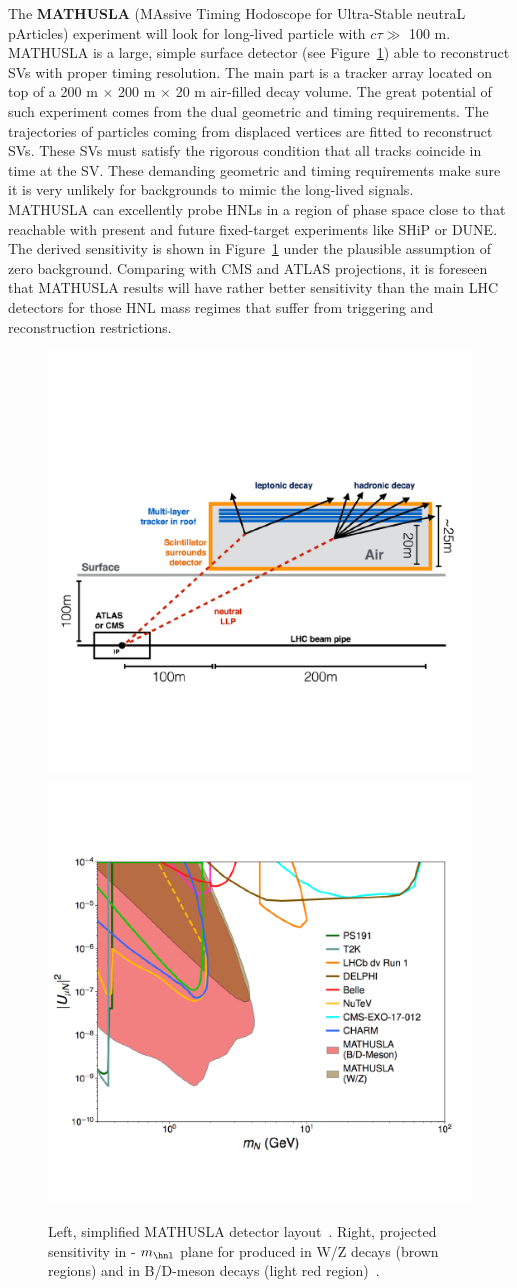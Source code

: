 The \textbf{MATHUSLA} (MAssive Timing
Hodoscope for Ultra-Stable neutraL pArticles) experiment will look for
long-lived particle with $c\tau \gg$ 100 m. MATHUSLA is a
large, simple surface detector (see Figure~\ref{fig:mathu2}) able to reconstruct SVs with proper timing
resolution. The main
part is a tracker array located on top of a 200 m $\times$ 200 m
$\times$ 20 m air-filled decay volume.
The great potential of such experiment comes from the dual geometric and timing
requirements. The trajectories of particles coming from displaced
vertices are fitted to reconstruct SVs. These SVs must satisfy the rigorous
condition that all tracks coincide in time at the SV. These demanding geometric and timing
requirements make sure it is very unlikely for backgrounds to mimic
the long-lived signals.\\
MATHUSLA can excellently probe HNLs in a region of phase space close to that reachable
with present and future fixed-target experiments like SHiP or
DUNE. The derived sensitivity is shown in Figure~\ref{fig:mathu2} under
the plausible assumption of zero background. Comparing with CMS and
ATLAS projections, it is foreseen that MATHUSLA results will have rather
better sensitivity than the main LHC detectors for those HNL mass
regimes that suffer from triggering and reconstruction restrictions.
\begin{figure}[h!]
\centering
    \includegraphics[clip,trim=0.3cm 0cm 1.cm 2cm, width=.45\textwidth]{Figures/c7/mathusla1.pdf}
    \includegraphics[clip,trim=0cm 2cm 0.5cm 3cm, width=.54\textwidth]{Figures/c7/mathusla2.pdf}
\caption{Left, simplified MATHUSLA detector
  layout~\cite{Alimena_2020}. Right, projected sensitivity in \mixparm
  - $m_\hnl$ plane for \hnl produced in W/Z decays (brown regions) and in B/D-meson decays (light red region)~\cite{Curtin_2019}.
}
\label{fig:mathu2}
\end{figure}

